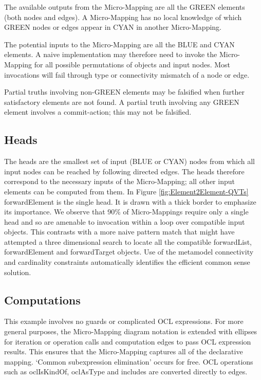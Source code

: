\documentclass[conference]{IEEEtran}
\begin{document}
The available outputs from the Micro-Mapping are all the GREEN elements (both nodes and edges). A Micro-Mapping has no local knowledge of which GREEN nodes or edges appear in CYAN in another Micro-Mapping.

The potential inputs to the Micro-Mapping are all the BLUE and CYAN elements. A naive implementation may therefore need to invoke the Micro-Mapping for all possible permutations of objects and input nodes. Most invocations will fail through type or connectivity mismatch of a node or edge. 

Partial truths involving non-GREEN elements may be falsified when further satisfactory elements are not found. A partial truth involving any GREEN element involves a commit-action; this may not be falsified. 

\subsection{Heads}
   
The heads are the smallest set of input (BLUE or CYAN) nodes from which all input nodes can be reached by following directed edges. %
The heads therefore correspond to the necessary inputs of the Micro-Mapping; all other input elements can be computed from them. In Figure \ref{fig:Element2Element-QVTs} forwardElement is the single head. It is drawn with a thick border to emphasize its importance. We observe that 90\% of Micro-Mappings require only a single head and so are amenable to invocation within a loop over compatible input objects. This contrasts with a more naive pattern match that might have attempted a three dimensional search to locate all the compatible forwardList, forwardElement and forwardTarget objects. Use of the metamodel connectivity and cardinality constraints  automatically identifies the efficient common sense solution.

\subsection{Computations}

This example involves no guards or complicated OCL expressions. For more general purposes, the Micro-Mapping diagram notation is extended with ellipses for iteration or operation calls and computation edges to pass OCL expression results. This ensures that the Micro-Mapping captures all of the declarative mapping. `Common subexpression elimination' occurs for free. OCL operations such as oclIsKindOf, oclAsType and includes are converted directly to edges.
\end{document}
